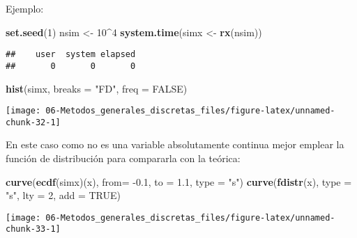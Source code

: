 \documentclass[
]{book}
\newenvironment{Shaded}{\begin{snugshade}}{\end{snugshade}}
\newcommand{\DataTypeTok}[1]{\textcolor[rgb]{0.13,0.29,0.53}{#1}}
\newcommand{\DecValTok}[1]{\textcolor[rgb]{0.00,0.00,0.81}{#1}}
\newcommand{\FloatTok}[1]{\textcolor[rgb]{0.00,0.00,0.81}{#1}}
\newcommand{\KeywordTok}[1]{\textcolor[rgb]{0.13,0.29,0.53}{\textbf{#1}}}
\newcommand{\NormalTok}[1]{#1}
\newcommand{\OperatorTok}[1]{\textcolor[rgb]{0.81,0.36,0.00}{\textbf{#1}}}
\newcommand{\OtherTok}[1]{\textcolor[rgb]{0.56,0.35,0.01}{#1}}
\newcommand{\StringTok}[1]{\textcolor[rgb]{0.31,0.60,0.02}{#1}}
\theoremstyle{break}
\theoremstyle{definition}
\theoremstyle{definition}
\theoremstyle{definition}
\theoremstyle{remark}
\begin{document}
\begin{enumerate}
  Ejemplo:

\begin{Shaded}
\begin{Highlighting}[]
\KeywordTok{set.seed}\NormalTok{(}\DecValTok{1}\NormalTok{)}
\NormalTok{nsim <-}\StringTok{ }\DecValTok{10}\OperatorTok{^}\DecValTok{4}
\KeywordTok{system.time}\NormalTok{(simx <-}\StringTok{ }\KeywordTok{rx}\NormalTok{(nsim))}
\end{Highlighting}
\end{Shaded}

\begin{verbatim}
##    user  system elapsed 
##       0       0       0
\end{verbatim}

\begin{Shaded}
\begin{Highlighting}[]
\KeywordTok{hist}\NormalTok{(simx, }\DataTypeTok{breaks =} \StringTok{"FD"}\NormalTok{, }\DataTypeTok{freq =} \OtherTok{FALSE}\NormalTok{)}
\end{Highlighting}
\end{Shaded}

  \begin{center}\texttt{[image: 06-Metodos\_generales\_discretas\_files/figure-latex/unnamed-chunk-32-1]} \end{center}

  En este caso como no es una variable absolutamente continua mejor emplear
  la función de distribución para compararla con la teórica:

\begin{Shaded}
\begin{Highlighting}[]
\KeywordTok{curve}\NormalTok{(}\KeywordTok{ecdf}\NormalTok{(simx)(x), }\DataTypeTok{from=} \FloatTok{-0.1}\NormalTok{, }\DataTypeTok{to =} \FloatTok{1.1}\NormalTok{, }\DataTypeTok{type =} \StringTok{"s"}\NormalTok{)}
\KeywordTok{curve}\NormalTok{(}\KeywordTok{fdistr}\NormalTok{(x), }\DataTypeTok{type =} \StringTok{"s"}\NormalTok{, }\DataTypeTok{lty =} \DecValTok{2}\NormalTok{, }\DataTypeTok{add =} \OtherTok{TRUE}\NormalTok{)}
\end{Highlighting}
\end{Shaded}

  \begin{center}\texttt{[image: 06-Metodos\_generales\_discretas\_files/figure-latex/unnamed-chunk-33-1]} \end{center}
\end{enumerate}
\end{document}
